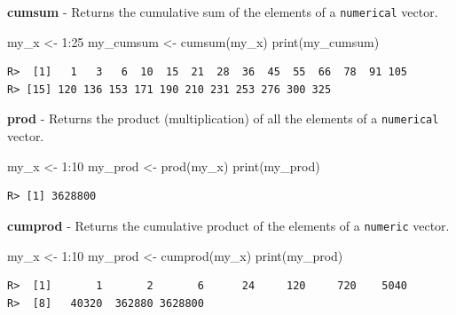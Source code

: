 \documentclass[
  12pt,
]{book}
\newenvironment{Shaded}{\begin{snugshade}}{\end{snugshade}}
\newcommand{\DecValTok}[1]{\textcolor[rgb]{0.06,0.06,0.06}{#1}}
\newcommand{\FunctionTok}[1]{\textcolor[rgb]{0,0,0}{#1}}
\newcommand{\NormalTok}[1]{#1}
\newcommand{\OtherTok}[1]{\textcolor[rgb]{0.37,0.37,0.37}{#1}}
\newcommand{\SpecialCharTok}[1]{\textcolor[rgb]{0,0,0}{#1}}
\begin{document}
\textbf{cumsum} - Returns the cumulative sum of the elements of a \texttt{numerical} vector. 

\begin{Shaded}
\begin{Highlighting}[]
\NormalTok{my\_x }\OtherTok{\textless{}{-}} \DecValTok{1}\SpecialCharTok{:}\DecValTok{25}
\NormalTok{my\_cumsum }\OtherTok{\textless{}{-}} \FunctionTok{cumsum}\NormalTok{(my\_x)}
\FunctionTok{print}\NormalTok{(my\_cumsum)}
\end{Highlighting}
\end{Shaded}

\begin{verbatim}
R>  [1]   1   3   6  10  15  21  28  36  45  55  66  78  91 105
R> [15] 120 136 153 171 190 210 231 253 276 300 325
\end{verbatim}

\textbf{prod} - Returns the product (multiplication) of all the elements of a \texttt{numerical} vector. 

\begin{Shaded}
\begin{Highlighting}[]
\NormalTok{my\_x }\OtherTok{\textless{}{-}} \DecValTok{1}\SpecialCharTok{:}\DecValTok{10}
\NormalTok{my\_prod }\OtherTok{\textless{}{-}} \FunctionTok{prod}\NormalTok{(my\_x)}
\FunctionTok{print}\NormalTok{(my\_prod)}
\end{Highlighting}
\end{Shaded}

\begin{verbatim}
R> [1] 3628800
\end{verbatim}

\textbf{cumprod} - Returns the cumulative product of the elements of a \texttt{numeric} vector. 

\begin{Shaded}
\begin{Highlighting}[]
\NormalTok{my\_x }\OtherTok{\textless{}{-}} \DecValTok{1}\SpecialCharTok{:}\DecValTok{10}
\NormalTok{my\_prod }\OtherTok{\textless{}{-}} \FunctionTok{cumprod}\NormalTok{(my\_x)}
\FunctionTok{print}\NormalTok{(my\_prod)}
\end{Highlighting}
\end{Shaded}

\begin{verbatim}
R>  [1]       1       2       6      24     120     720    5040
R>  [8]   40320  362880 3628800
\end{verbatim}
\end{document}

